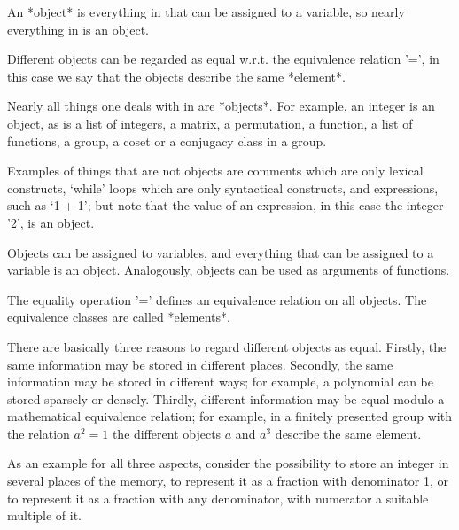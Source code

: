 

An *object* is everything in {\GAP} that can be assigned to a variable,
so nearly everything in {\GAP} is an object.

Different objects can be regarded as equal w.r.t. the equivalence
relation '=',
in this case we say that the objects describe the same *element*.


Nearly all things one deals with in {\GAP} are *objects*.
For example, an integer is an object, as is a list of integers, a matrix,
a permutation, a function, a list of functions, a group,
a coset or a conjugacy class in a group.

Examples of things that are not objects are
comments which are only lexical constructs,
`while' loops which are only syntactical constructs,
and expressions, such as `1 + 1';
but note that the value of an expression, in this case the integer '2',
is an object.

Objects can be assigned to variables,
and everything that can be assigned to a variable is an object.
Analogously, objects can be used as arguments of functions.


The equality operation '=' defines an equivalence relation on all {\GAP}
objects.
The equivalence classes are called *elements*.

There are basically three reasons to regard different objects as equal.
Firstly, the same information may be stored in different places.
Secondly, the same information may be stored in different ways;
for example, a polynomial can be stored sparsely or densely.
Thirdly, different information may be equal modulo a mathematical
equivalence relation;
for example, in a finitely presented group with the relation $a^2 = 1$
the different objects $a$ and $a^3$ describe the same element.

As an example for all three aspects, consider the possibility to store
an integer in several places of the memory,
to represent it as a fraction with denominator 1,
or to represent it as a fraction with any denominator, with numerator
a suitable multiple of it.

